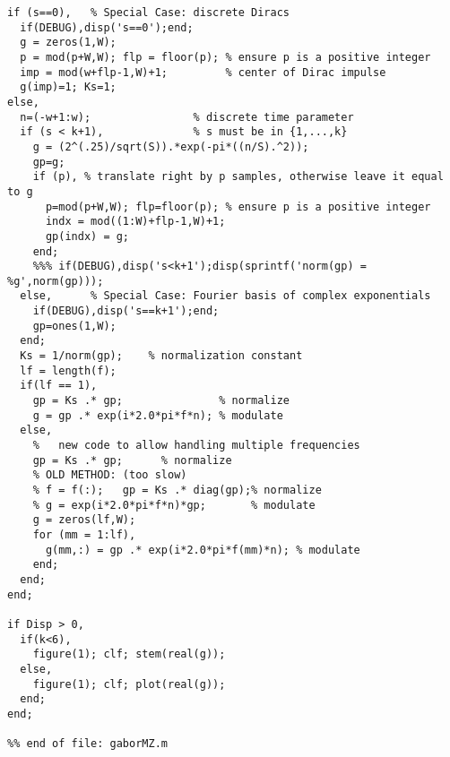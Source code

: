 \begin{verbatim}
if (s==0),   % Special Case: discrete Diracs
  if(DEBUG),disp('s==0');end;
  g = zeros(1,W);  
  p = mod(p+W,W); flp = floor(p); % ensure p is a positive integer
  imp = mod(w+flp-1,W)+1;         % center of Dirac impulse
  g(imp)=1; Ks=1;
else,
  n=(-w+1:w);                % discrete time parameter
  if (s < k+1),              % s must be in {1,...,k}
    g = (2^(.25)/sqrt(S)).*exp(-pi*((n/S).^2));
    gp=g;
    if (p), % translate right by p samples, otherwise leave it equal to g
      p=mod(p+W,W); flp=floor(p); % ensure p is a positive integer  
      indx = mod((1:W)+flp-1,W)+1;
      gp(indx) = g;
    end; 
    %%% if(DEBUG),disp('s<k+1');disp(sprintf('norm(gp) = %g',norm(gp)));
  else,      % Special Case: Fourier basis of complex exponentials
    if(DEBUG),disp('s==k+1');end;
    gp=ones(1,W);
  end;
  Ks = 1/norm(gp);    % normalization constant
  lf = length(f);
  if(lf == 1),  
    gp = Ks .* gp;               % normalize
    g = gp .* exp(i*2.0*pi*f*n); % modulate
  else,
    %   new code to allow handling multiple frequencies
    gp = Ks .* gp;      % normalize
    % OLD METHOD: (too slow)
    % f = f(:);   gp = Ks .* diag(gp);% normalize
    % g = exp(i*2.0*pi*f*n)*gp;       % modulate
    g = zeros(lf,W);
    for (mm = 1:lf),
      g(mm,:) = gp .* exp(i*2.0*pi*f(mm)*n); % modulate
    end;
  end;
end;

if Disp > 0,
  if(k<6), 
    figure(1); clf; stem(real(g)); 
  else,
    figure(1); clf; plot(real(g)); 
  end;
end;

%% end of file: gaborMZ.m
\end{verbatim}   

